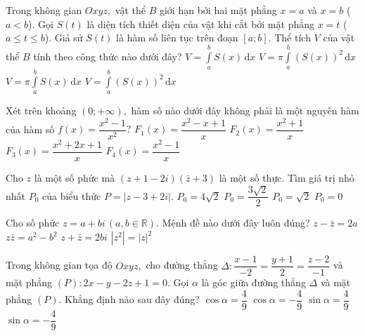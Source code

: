 \begin{ex}%
Trong không gian $Oxyz,$ vật thể $B$ giới hạn bởi hai mặt phẳng $x=a$ và $x=b$ ($a<b$). Gọi $S(t)$ là diện tích thiết diện của vật khi cắt bởi mặt phẳng $x=t$ ($a\le t\le b$). Giả sử $S(t)$ là hàm số liên tục trên đoạn $[a; b].$ Thể tích $V$ của vật thể $B$ tính theo công thức nào dưới đây?
\choice
{\True $V=\displaystyle \int\limits_{a}^b S(x)\mathrm{\,d}x$}
{$V=\displaystyle \pi\int\limits_{a}^b (S(x))^2\mathrm{\,d}x$}
{$V=\displaystyle \pi\int\limits_{a}^b S(x)\mathrm{\,d}x$}
{$V=\displaystyle \int\limits_{a}^b (S(x))^2\mathrm{\,d}x$}
\end{ex}

\begin{ex}%
Xét trên khoảng $(0; +\infty),$ hàm số nào dưới đây không phải là một nguyên hàm của hàm số $f(x)=\dfrac{x^2-1}{x^2}?$
\choice
{$F_1(x)=\dfrac{x^2-x+1}{x}$}
{$F_2(x)=\dfrac{x^2+1}{x}$}
{$F_3(x)=\dfrac{x^2+2x+1}{x}$}
{\True $F_4(x)=\dfrac{x^2-1}{x}$}
\end{ex}

\begin{ex}%
Cho $z$ là một số phức mà $(z+1-2i)(\bar z+3)$ là một số thực. Tìm giá trị nhỏ nhất $P_0$ của biểu thức $P=|z-3+2i|.$
\choice
{\True $P_0=4\sqrt2$}
{$P_0=\dfrac{3\sqrt2}2$}
{$P_0=\sqrt2$}
{$P_0=0$}
\end{ex}

\begin{ex}%
Cho số phức $z=a+bi\, (a, b\in\mathbb{R}).$ Mệnh đề nào dưới đây luôn đúng?
\choice
{$z-\bar z=2a$}
{$z\bar z=a^2-b^2$}
{$z+\bar z=2bi$}
{\True $|z^2|=|z|^2$}
\end{ex}

\begin{ex}%
Trong không gian tọa độ $Oxyz,$ cho đường thẳng $\Delta\colon \dfrac{x-1}{-2}=\dfrac{y+1}2=\dfrac{z-2}{-1}$ và mặt phẳng $(P)\colon 2x-y-2z+1=0.$ Gọi $\alpha$ là góc giữa đường thẳng $\Delta$ và mặt phẳng $(P).$ Khẳng định nào sau đây đúng?
\choice
{$\cos \alpha=\dfrac49$}
{$\cos \alpha=-\dfrac49$}
{\True $\sin \alpha=\dfrac49$}
{$\sin \alpha=-\dfrac49$}
\end{ex}



